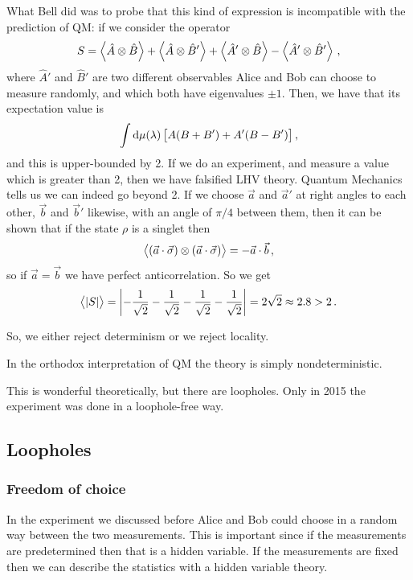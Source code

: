 \documentclass[main.tex]{subfiles}
\begin{document}
What Bell did was to probe that this kind of expression is incompatible with the prediction of QM: if we consider the operator 
%
\begin{align} 
S =
\expval{\hat{A} \otimes \hat{B}}+
\expval{\hat{A} \otimes \hat{B}'} +
\expval{\hat{A}' \otimes \hat{B}} -
\expval{\hat{A}' \otimes \hat{B}'} 
\,,
\end{align}
%
where \(\hat{A}'\) and \(\hat{B}'\) are two different observables Alice and Bob can choose to measure randomly, and which both have eigenvalues \(\pm 1\). Then, we have that its expectation value is 
%
\begin{align}
\int \dd{\mu (\lambda )} \qty[A (B + B') + A' (B - B')] 
\,,
\end{align}
%
and this is upper-bounded by 2. 
If we do an experiment, and measure a value which is greater than 2, then we have falsified LHV theory. 
Quantum Mechanics tells us we can indeed go beyond 2. 
If we choose \(\vec{a}\) and \(\vec{a}'\) at right angles to each other, \(\vec{b} \) and \(\vec{b}'\) likewise, with an angle of \(\pi /4\) between them, then it can be shown that if the state \(\rho \) is a singlet then 
%
\begin{align}
\expval{(\vec{a} \cdot \vec{\sigma}) \otimes (\vec{a} \cdot \vec{\sigma})} = - \vec{a} \cdot \vec{b} 
\,,
\end{align}
%
so if \(\vec{a} = \vec{b} \) we have perfect anticorrelation. So we get 
%
\begin{align}
\expval{\abs{S}} = \abs{- \frac{1}{\sqrt{2}} - \frac{1}{\sqrt{2}} - \frac{1}{\sqrt{2}} - \frac{1}{\sqrt{2}} } = 2 \sqrt{2} \approx 2.8  > 2
\,.
\end{align}

So, we either reject determinism or we reject locality. 

In the orthodox interpretation of QM the theory is simply nondeterministic. 

This is wonderful theoretically, but there are loopholes. 
Only in 2015 the experiment was done in a loophole-free way. 

\subsection{Loopholes}

\subsubsection{Freedom of choice}

In the experiment we discussed before Alice and Bob could choose in a random way between the two measurements. This is important since if the measurements are predetermined then that is a hidden variable. 
If the measurements are fixed then we can describe the statistics with a hidden variable theory. 
\end{document}
